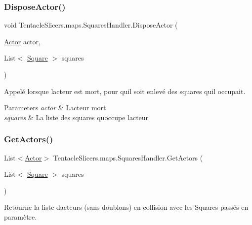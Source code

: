 \subsubsection{\texorpdfstring{Dispose\+Actor()}{DisposeActor()}}
{\footnotesize\ttfamily void Tentacle\+Slicers.\+maps.\+Squares\+Handler.\+Dispose\+Actor (\begin{DoxyParamCaption}\item[{\hyperlink{class_tentacle_slicers_1_1actors_1_1_actor}{Actor}}]{actor,  }\item[{List$<$ \hyperlink{class_tentacle_slicers_1_1maps_1_1_square}{Square} $>$}]{squares }\end{DoxyParamCaption})}



Appelé lorsque l\textquotesingle{}acteur est mort, pour qu\textquotesingle{}il soit enlevé des squares qu\textquotesingle{}il occupait. 


\begin{DoxyParams}{Parameters}
{\em actor} & L\textquotesingle{}acteur mort \\
\hline
{\em squares} & La liste des squares qu\textquotesingle{}occupe l\textquotesingle{}acteur \\
\hline
\end{DoxyParams}
\mbox{\label{class_tentacle_slicers_1_1maps_1_1_squares_handler_a757757f75b4fc5fd74739f3d55ea7e00}} 
\subsubsection{\texorpdfstring{Get\+Actors()}{GetActors()}\hspace{0.1cm}{\footnotesize\ttfamily [1/2]}}
{\footnotesize\ttfamily List$<$\hyperlink{class_tentacle_slicers_1_1actors_1_1_actor}{Actor}$>$ Tentacle\+Slicers.\+maps.\+Squares\+Handler.\+Get\+Actors (\begin{DoxyParamCaption}\item[{List$<$ \hyperlink{class_tentacle_slicers_1_1maps_1_1_square}{Square} $>$}]{squares }\end{DoxyParamCaption})}



Retourne la liste d\textquotesingle{}acteurs (sans doublons) en collision avec les Squares passés en paramètre. 



